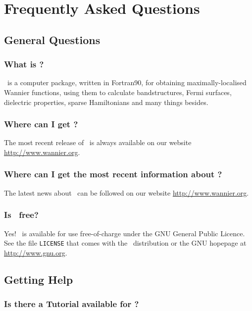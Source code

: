 \chapter{Frequently Asked Questions}\label{chap:faq}


\section{General Questions}

\subsection{What is \wannier?}

\wannier\ is a computer package, written in Fortran90, for obtaining
maximally-localised Wannier functions, using them to calculate
bandstructures, Fermi surfaces, dielectric properties, sparse
Hamiltonians and many things besides.

\subsection{Where can I get \wannier?}

The most recent release of \wannier\ is always available on our
website \url{http://www.wannier.org}.

\subsection{Where can I get the most recent information about
  \wannier?}

The latest news about \wannier\ can be followed on our website \url{http://www.wannier.org}.

\subsection{Is \wannier\ free?}

Yes! \wannier\ is available for use free-of-charge under the GNU
General Public Licence. See the file {\tt LICENSE} that comes with the
\wannier\ distribution or the GNU hopepage at \url{http://www.gnu.org}. 

\section{Getting Help}

\subsection{Is there a Tutorial available for \wannier?}

